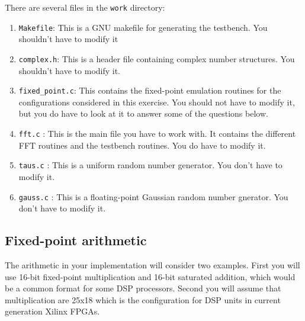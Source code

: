 \documentclass[11pt]{article}
\begin{document}
There are several files in the {\tt work} directory:
\begin{enumerate}
\item {\tt Makefile}: This is a GNU makefile for generating the testbench. You shouldn't have to modify it
\item {\tt complex.h}:  This is a header file containing complex number structures.  You shouldn't have to modify it.
\item {\tt fixed\_point.c}: This contains the fixed-point emulation routines for the configurations considered in this exercise.  You should not have to modify it, but you do have to look at it to answer some of the questions below.
\item {\tt fft.c} : This is the main file you have to work with.  It contains the different FFT routines and the testbench routines.  You do have to modify it.
\item {\tt taus.c} : This is a uniform random number generator.  You don't have to modify it.
\item {\tt gauss.c} : This is a floating-point Gaussian random number gnerator.  You don't have to modify it. 
\end{enumerate}

\subsection{Fixed-point arithmetic}
The arithmetic in your implementation will consider two examples.  First you will use 16-bit fixed-point multiplication and 
16-bit saturated addition, which would be a common format for some DSP processors. Second you will assume that multiplication are
25x18 which is the configuration for DSP units in current generation Xilinx FPGAs.
\end{document}
